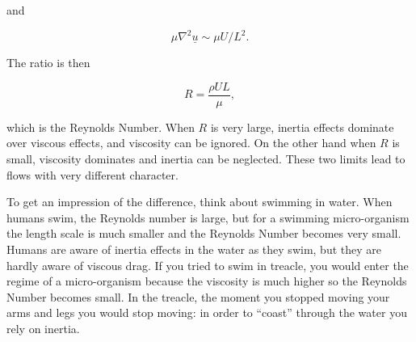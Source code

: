   \noindent{}and 

  \begin{equation*}\mu \nabla^2 \underline{u} \sim \mu U / L^2. 
  \tag{19}\end{equation*} 

  The ratio is then 

  \begin{equation*}R = \dfrac{\rho U L}{\mu}, \tag{20}\end{equation*} 

  \noindent{}which is the Reynolds Number. When $R$ is very large, inertia 
  effects dominate over viscous effects, and viscosity can be ignored. On the 
  other hand when $R$ is small, viscosity dominates and inertia can be 
  neglected. These two limits lead to flows with very different character. 

  To get an impression of the difference, think about swimming in water. When 
  humans swim, the Reynolds number is large, but for a swimming micro-organism 
  the length scale is much smaller and the Reynolds Number becomes very small. 
  Humans are aware of inertia effects in the water as they swim, but they are 
  hardly aware of viscous drag. If you tried to swim in treacle, you would 
  enter the regime of a micro-organism because the viscosity is much higher so 
  the Reynolds Number becomes small. In the treacle, the moment you stopped 
  moving your arms and legs you would stop moving: in order to ``coast'' 
  through the water you rely on inertia. 